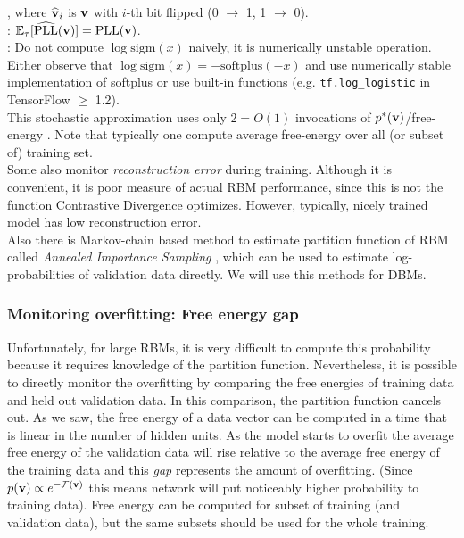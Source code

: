 \bg
{},
\eg
where $\widehat{\mathbf{v}}_{i}$ is $\mathbf{v}$ with $i$-th bit flipped (0 $\rightarrow$ 1, 1 $\rightarrow$ 0).\\
: $\mathbb{E}_{\tau}[\widehat{\text{PLL}}(\mathbf{v})]=\text{PLL}(\mathbf{v})$.
\\
: Do not compute $\log \text{sigm}(x)$ naively, it is numerically unstable operation. Either observe that $\log \text{sigm}(x)=-\text{softplus}(-x)$ and use numerically stable implementation of softplus or use built-in functions (e.g. \texttt{tf.log\_logistic} in TensorFlow $\geq$ 1.2).
\\[1em]
This stochastic approximation uses only $2=O(1)$ invocations of $p^*(\mathbf{v})$/free-energy . Note that typically one compute average free-energy over all (or subset of) training set.
\\[1em]
 Some also monitor \emph{reconstruction error} during training. Although it is convenient, it is poor measure of actual RBM performance, since this is not the function Contrastive Divergence optimizes. However, typically, nicely trained model has low reconstruction error.
\\[1em]
Also there is Markov-chain based method to estimate partition function of RBM called \emph{Annealed Importance Sampling} \cite{salakhutdinov2013learning}, which can be used to estimate log-probabilities of validation data directly. We will use this methods for DBMs.

\subsubsection{Monitoring overfitting: Free energy gap}
Unfortunately, for large RBMs, it is very difficult to compute this probability
because it requires knowledge of the partition function. Nevertheless, it is possible to directly monitor
the overfitting by comparing the free energies of training data and held out validation data. In this
comparison, the partition function cancels out. As we saw, the free energy of a data vector can be computed in
a time that is linear in the number of hidden units. As the
model starts to overfit the average free energy of the validation data will rise relative to the average
free energy of the training data and this \emph{gap} represents the amount of overfitting. (Since $p(\mathbf{v})\propto e^{-\mathcal{F}(\mathbf{v})}$ this means network will put noticeably higher probability to training data). Free energy can be computed for subset of training (and validation data), but the same subsets should be used for the whole training.

